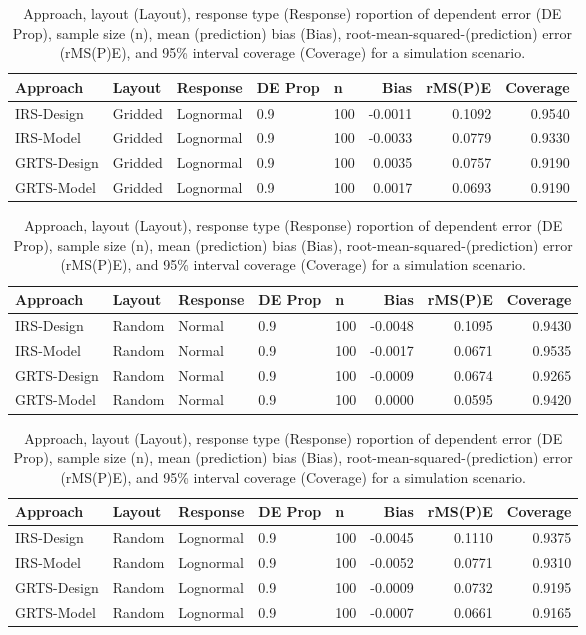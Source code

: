 \documentclass[]{elsarticle} %
\begin{document}
\begin{table}[ht]
\centering
\begin{tabular}{lllllrrr}
  \hline
Approach & Layout & Response & DE Prop & n & Bias & rMS(P)E & Coverage \\ 
  \hline
IRS-Design & Gridded & Lognormal & 0.9 & 100 & -0.0011 & 0.1092 & 0.9540 \\ 
  IRS-Model & Gridded & Lognormal & 0.9 & 100 & -0.0033 & 0.0779 & 0.9330 \\ 
  GRTS-Design & Gridded & Lognormal & 0.9 & 100 & 0.0035 & 0.0757 & 0.9190 \\ 
  GRTS-Model & Gridded & Lognormal & 0.9 & 100 & 0.0017 & 0.0693 & 0.9190 \\ 
   \hline
\end{tabular}
\caption{Approach, layout (Layout), response type (Response) roportion of dependent error (DE Prop), sample size (n), mean (prediction) bias (Bias), root-mean-squared-(prediction) error (rMS(P)E), and 95\% interval coverage (Coverage) for a simulation scenario.} 
\end{table}
\begin{table}[ht]
\centering
\begin{tabular}{lllllrrr}
  \hline
Approach & Layout & Response & DE Prop & n & Bias & rMS(P)E & Coverage \\ 
  \hline
IRS-Design & Random & Normal & 0.9 & 100 & -0.0048 & 0.1095 & 0.9430 \\ 
  IRS-Model & Random & Normal & 0.9 & 100 & -0.0017 & 0.0671 & 0.9535 \\ 
  GRTS-Design & Random & Normal & 0.9 & 100 & -0.0009 & 0.0674 & 0.9265 \\ 
  GRTS-Model & Random & Normal & 0.9 & 100 & 0.0000 & 0.0595 & 0.9420 \\ 
   \hline
\end{tabular}
\caption{Approach, layout (Layout), response type (Response) roportion of dependent error (DE Prop), sample size (n), mean (prediction) bias (Bias), root-mean-squared-(prediction) error (rMS(P)E), and 95\% interval coverage (Coverage) for a simulation scenario.} 
\end{table}
\begin{table}[ht]
\centering
\begin{tabular}{lllllrrr}
  \hline
Approach & Layout & Response & DE Prop & n & Bias & rMS(P)E & Coverage \\ 
  \hline
IRS-Design & Random & Lognormal & 0.9 & 100 & -0.0045 & 0.1110 & 0.9375 \\ 
  IRS-Model & Random & Lognormal & 0.9 & 100 & -0.0052 & 0.0771 & 0.9310 \\ 
  GRTS-Design & Random & Lognormal & 0.9 & 100 & -0.0009 & 0.0732 & 0.9195 \\ 
  GRTS-Model & Random & Lognormal & 0.9 & 100 & -0.0007 & 0.0661 & 0.9165 \\ 
   \hline
\end{tabular}
\caption{Approach, layout (Layout), response type (Response) roportion of dependent error (DE Prop), sample size (n), mean (prediction) bias (Bias), root-mean-squared-(prediction) error (rMS(P)E), and 95\% interval coverage (Coverage) for a simulation scenario.} 
\end{table}
\end{document}

